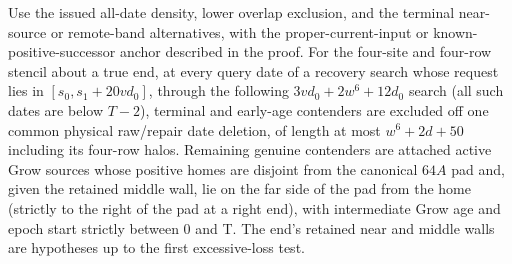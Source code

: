 \begin{lemma}\label{lem:competitors}
Use the issued all-date density, lower overlap exclusion, and the terminal near-source or remote-band alternatives, with the proper-current-input or known-positive-successor anchor described in the proof. For the four-site and four-row stencil about a true end, at every query date of a recovery search whose request lies in \([s_0,s_1+20v d_0]\), through the following \(3v d_0+2w^6+12d_0\) search (all such dates are below \(T-2\)), terminal and early-age contenders are excluded off one common physical raw/repair date deletion, of length at most \(w^6+2d+50\) including its four-row halos. Remaining genuine contenders are attached active Grow sources whose positive homes are disjoint from the canonical \(64A\) pad and, given the retained middle wall, lie on the far side of the pad from the home (strictly to the right of the pad at a right end), with intermediate Grow age and epoch start strictly between 0 and T. The end's retained near and middle walls are hypotheses up to the first excessive-loss test.
\end{lemma}
